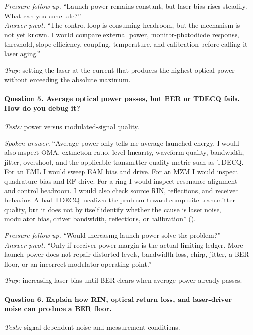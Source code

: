 \textit{Pressure follow-up.} ``Launch power remains constant, but laser bias
rises steadily. What can you conclude?''\\
\textit{Answer pivot.} ``The control loop is consuming headroom, but the
mechanism is not yet known. I would compare external power, monitor-photodiode
response, threshold, slope efficiency, coupling, temperature, and calibration
before calling it laser aging.''

\textit{Trap:} setting the laser at the current that produces the highest
optical power without exceeding the absolute maximum.

\paragraph{Question 5. Average optical power passes, but BER or TDECQ fails. How
do you debug it?}
\textit{Tests:} power versus modulated-signal quality.

\textit{Spoken answer.}
``Average power only tells me average launched energy. I would also inspect
OMA, extinction ratio, level linearity, waveform quality, bandwidth, jitter,
overshoot, and the applicable transmitter-quality metric such as TDECQ. For an
EML I would sweep EAM bias and drive. For an MZM I would inspect quadrature
bias and RF drive. For a ring I would inspect resonance alignment and control
headroom. I would also check source RIN, reflections, and receiver behavior. A
bad TDECQ localizes the problem toward composite transmitter quality, but it
does not by itself identify whether the cause is laser noise, modulator bias,
driver bandwidth, reflections, or calibration''
().

\textit{Pressure follow-up.} ``Would increasing launch power solve the
problem?''\\
\textit{Answer pivot.} ``Only if receiver power margin is the actual limiting
ledger. More launch power does not repair distorted levels, bandwidth loss,
chirp, jitter, a BER floor, or an incorrect modulator operating point.''

\textit{Trap:} increasing laser bias until BER clears when average power
already passes.

\paragraph{Question 6. Explain how RIN, optical return loss, and laser-driver
noise can produce a BER floor.}
\textit{Tests:} signal-dependent noise and measurement conditions.

